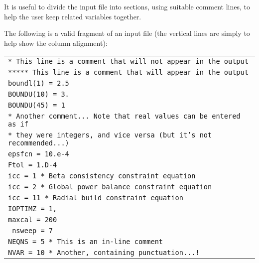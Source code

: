 \documentclass[11pt,a4paper]{report}
\begin{document}
It is useful to divide the input file into sections, using suitable comment
lines, to help the user keep related variables together.

The following is a valid fragment of an input file (the vertical lines are
simply to help show the column alignment):
\begin{center}
  \begin{tabular}{||l}
    $\!\!$\texttt{* This line is a comment that will not appear in the output} \\
    $\!\!$\texttt{***** This line is a comment that will appear in the output} \\
    $\!\!$\texttt{boundl(1) = 2.5} \\
    $\!\!$\texttt{BOUNDU(10) = 3.} \\
    $\!\!$\texttt{BOUNDU(45) = 1} \\
    $\!\!$\texttt{* Another comment... Note that real values can be entered as if} \\
    $\!\!$\texttt{* they were integers, and vice versa (but it's not recommended...)} \\
    $\!\!$\texttt{epsfcn = 10.e-4} \\
    $\!\!$\texttt{Ftol = 1.D-4} \\
    $\!\!$\texttt{icc =   1 * Beta consistency constraint equation} \\
    $\!\!$\texttt{icc =   2 * Global power balance constraint equation} \\
    $\!\!$\texttt{icc =   11 * Radial build constraint equation} \\
    $\!\!$\texttt{IOPTIMZ = 1,} \\
    $\!\!$\texttt{maxcal = 200} \\
    $\!\!$\texttt{ nsweep = 7} \\
    $\!\!$\texttt{NEQNS = 5  *  This is an in-line comment} \\
    $\!\!$\texttt{NVAR = 10  *  Another, containing punctuation...!} \\
  \end{tabular}
\end{center}
\end{document}
